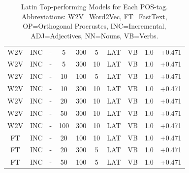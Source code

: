\begin{table}[h]
\begin{tabular}{cccccccccc}
W2V             & INC              & -                     & 5                 & 300             & 5              & LAT           & VB             & 1.0            & +0.471          \\
W2V             & INC              & -                     & 5                 & 300             & 10             & LAT           & VB             & 1.0            & +0.471          \\
W2V             & INC              & -                     & 10                & 100             & 5              & LAT           & VB             & 1.0            & +0.471          \\
W2V             & INC              & -                     & 10                & 300             & 10             & LAT           & VB             & 1.0            & +0.471          \\
W2V             & INC              & -                     & 20                & 300             & 10             & LAT           & VB             & 1.0            & +0.471          \\
W2V             & INC              & -                     & 50                & 300             & 10             & LAT           & VB             & 1.0            & +0.471          \\
W2V             & INC              & -                     & 100               & 300             & 10             & LAT           & VB             & 1.0            & +0.471          \\
FT              & INC              & -                     & 20                & 100             & 10             & LAT           & VB             & 1.0            & +0.471          \\
FT              & INC              & -                     & 20                & 300             & 5              & LAT           & VB             & 1.0            & +0.471          \\
FT              & INC              & -                     & 50                & 100             & 5              & LAT           & VB             & 1.0            & +0.471          \\
\bottomrule
\end{tabular}
\caption{Latin Top-performing Models for Each POS-tag. Abbreviations: W2V=Word2Vec, FT=FastText, OP=Orthogonal Procrustes, INC=Incremental, ADJ=Adjectives, NN=Nouns, VB=Verbs.}
\label{tab:lat-posresults}
\end{table}


